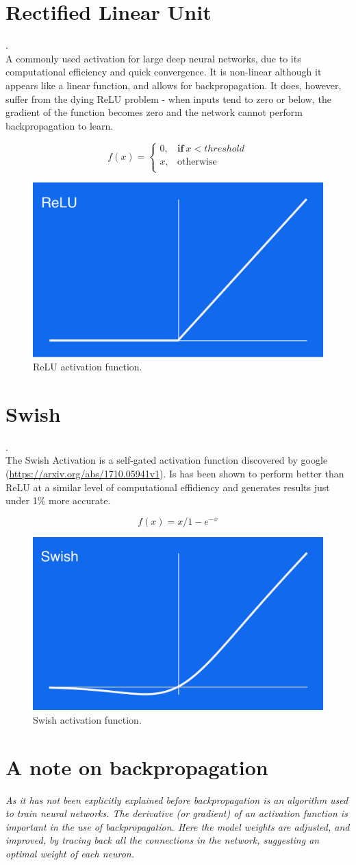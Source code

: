 \section{Rectified Linear Unit}.\\
A commonly used activation for large deep neural networks, due to its computational efficiency and quick convergence. It is non-linear although it appears like a linear function, and allows for backpropagation. It does, however, suffer from the dying ReLU problem - when inputs tend to zero or below, the gradient of the function becomes zero and the network cannot perform backpropagation to learn.

\begin{equation}
f(x) =
    \begin{cases}
      0 , & \mathbf{if} \ x < threshold \\
      x , & \text{otherwise}\\
    \end{cases}
  \end{equation}
\begin{figure}[H]
\centering
\includegraphics[width=.265\textwidth]{relu.png}
\caption{ReLU activation function.}
\end{figure}



\section{Swish}.\\
The Swish Activation is a self-gated activation function discovered by google (\url{https://arxiv.org/abs/1710.05941v1}). Is has been shown to perform better than ReLU at a similar level of computational effidiency and generates results just under 1\% more accurate.

\begin{equation}
f(x) = x/1-e^{-x}
  \end{equation}
\begin{figure}[H]
\centering
\includegraphics[width=.265\textwidth]{swish.png}
\caption{Swish activation function.}
\end{figure}

\section{\textbf{A note on backpropagation}}
\emph{As it has not been explicitly explained before backpropagation is an algorithm used to train neural networks. The derivative (or gradient) of an activation function is important in the use of backpropagation. Here the model weights are adjusted, and improved, by tracing back all the connections in the network, suggesting an optimal weight of each neuron.}
